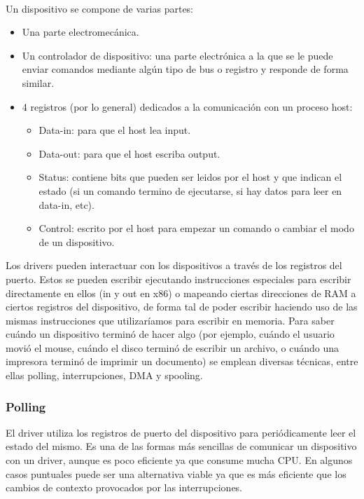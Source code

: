 \documentclass{article}
\begin{document}
~

Un dispositivo se compone de varias partes:

\begin{itemize}
 \item Una parte electromecánica.
 \item Un controlador de dispositivo: una parte electrónica a la que se le puede enviar comandos mediante algún tipo de bus o registro y responde de forma similar.
 \item 4 registros (por lo general) dedicados a la comunicación con un proceso host:
 \begin{itemize}
  \item Data-in: para que el host lea input.
  \item Data-out: para que el host escriba output.
  \item Status: contiene bits que pueden ser leidos por el host y que indican el estado (si un comando termino de ejecutarse, si hay datos para leer en data-in, etc).
  \item Control: escrito por el host para empezar un comando o cambiar el modo de un dispositivo.
 \end{itemize}

\end{itemize}

Los drivers pueden interactuar con los dispositivos a través de los registros del puerto. Estos se pueden escribir ejecutando instrucciones especiales para escribir directamente en ellos (in y out en x86) o mapeando ciertas direcciones de RAM a ciertos registros del dispositivo, de forma tal de poder escribir haciendo uso de las mismas instrucciones que utilizaríamos para escribir en memoria. Para saber cu\'ando un dispositivo terminó de hacer algo (por ejemplo, cu\'ando el usuario movi\'o el mouse, cu\'ando el disco termin\'o de escribir un archivo, o cu\'ando una impresora termin\'o de imprimir un documento) se emplean diversas técnicas, entre ellas polling, interrupciones, DMA y spooling.

\subsubsection{Polling}

El driver utiliza los registros de puerto del dispositivo para peri\'odicamente leer el estado del mismo. Es una de las formas m\'as sencillas de comunicar un dispositivo con un driver, aunque es poco eficiente ya que consume mucha CPU. En algunos casos puntuales puede ser una alternativa viable ya que es m\'as eficiente que los cambios de contexto provocados por las interrupciones.
\end{document}
